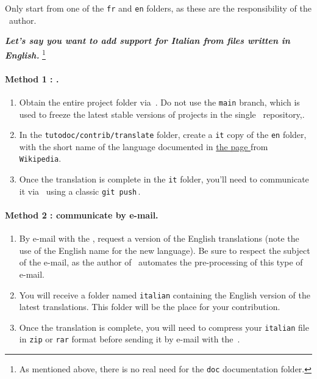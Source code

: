 \begin{tdocwarn}
    Only start from one of the \verb#fr# and \verb#en# folders, as these are the responsibility of the \thisproj\ author.
\end{tdocwarn}


\medskip


\emph{\textbf{Let's say you want to add support for Italian from files written in English.}}%
\footnote{
    As mentioned above, there is no real need for the \texttt{doc} documentation folder.
}


\paragraph{Method 1 : \git.}

\begin{enumerate}
      \item Obtain the entire project folder via \thisrepo\,.
    Do not use the \verb#main# branch, which is used to freeze the latest stable versions of projects in the single \thismonorepo\ repository,.

      \item In the \verb#tutodoc/contrib/translate# folder, create a \verb#it# copy of the \verb#en# folder, with the short name of the language documented in
      \href{https://en.wikipedia.org/wiki/IETF_language_tag#List_of_common_primary_language_subtags}%
           {the page }
      from \texttt{Wikipedia}.

      \item Once the translation is complete in the \verb#it# folder, you'll need to communicate it via \thisrepo\ using a classic \verb#git push#\,.
\end{enumerate}


\paragraph{Method 2 : communicate by e-mail.}

\begin{enumerate}
      \item By e-mail with the , request a version of the English translations (note the use of the English name for the new language).
    Be sure to respect the subject of the e-mail, as the author of \thisproj\ automates the pre-processing of this type of e-mail.

      \item You will receive a folder named \verb#italian# containing the English version of the latest translations.
    This folder will be the place for your contribution.

      \item Once the translation is complete, you will need to compress your \verb#italian# file in \verb#zip# or \verb#rar# format before sending it by e-mail with the \,.
\end{enumerate}


